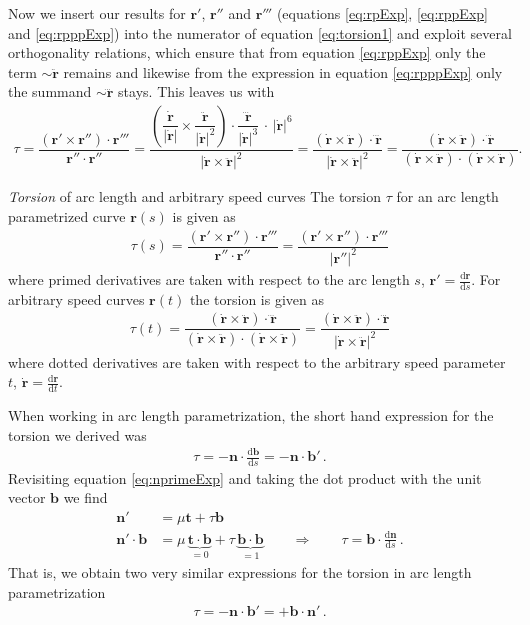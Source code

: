 \documentclass[11pt, DINA4, fleqn]{amsart}
\def\df{\mathrm{d}\xspace}
\newcommand{\dd}[2]{\frac{\df#1}{\df#2}}
\def\vr{\boldsymbol{r}\xspace}
\def\vrd{\dot{\vr}\xspace}
\def\vrdd{\ddot{\vr}\xspace}
\def\vrddd{\dddot{\vr}\xspace}
\def\vrp{{\vr}'\xspace}
\def\vt{\boldsymbol{t}\xspace}
\def\vn{\boldsymbol{n}\xspace}
\def\vb{\boldsymbol{b}\xspace}
\begin{document}
Now we insert our results for $\vr'$, $\vr''$ and $\vr'''$ (equations \eqref{eq:rpExp}, \eqref{eq:rppExp} and \eqref{eq:rpppExp}) into the numerator of equation \eqref{eq:torsion1} and exploit several orthogonality relations, which ensure that from equation \eqref{eq:rppExp} only the term $\sim \vrdd$ remains and likewise from the expression in equation \eqref{eq:rpppExp} only the summand $\sim\vrddd$ stays. This leaves us with
\begin{align}
\tau =
\dfrac{ \left(\vr'\times \vr''\right) \cdot \vr'''}{\vr''\cdot \vr''} =
\dfrac{\left(\dfrac{\vrd}{|\vrd|} \times \dfrac{\vrdd}{|\vrd|^2}\right) \cdot \dfrac{\vrddd}{|\vrd|^3}  \, \cdot \,|\vrd|^6}{|\vrd \times \vrdd|^2}
= 
\dfrac{\left(\vrd \times \vrdd \right) \cdot \vrddd }{|\vrd \times \vrdd|^2}
= 
\dfrac{\left(\vrd \times \vrdd \right) \cdot \vrddd }{(\vrd \times \vrdd)\cdot (\vrd \times \vrdd)}.
\end{align}

\begin{mybox_tc3}{\emph{Torsion} of arc length and arbitrary speed curves}
The torsion $\tau$ for an arc length parametrized curve $\vr(s)$ is given as
\begin{align}
\tau(s) = \dfrac{ \left(\vr'\times \vr''\right) \cdot \vr'''}{\vr''\cdot \vr''} = \dfrac{ \left(\vr'\times \vr''\right) \cdot \vr'''}{|\vr''|^2}
\end{align}
where primed derivatives are taken with respect to the arc length $s$, $\vrp = \dd{\vr}{s}$. For arbitrary speed curves $\vr(t)$ the torsion is given as
\begin{align}
\tau(t) = 
\dfrac{\left(\vrd \times \vrdd \right) \cdot \vrddd }{(\vrd \times \vrdd)\cdot (\vrd \times \vrdd)}
=
\dfrac{\left(\vrd \times \vrdd \right) \cdot \vrddd }{|\vrd \times \vrdd|^2}
\end{align}
where dotted derivatives are taken with respect to the arbitrary speed parameter $t$, $\vrd= \dd{\vr}{t}$.
\end{mybox_tc3}
When working in arc length parametrization, the short hand expression for the torsion we derived was
\begin{align}
\tau= -\vn\cdot \dd{\vb}{s} = -\vn \cdot \vb' \, .
\end{align}
Revisiting equation \eqref{eq:nprimeExp} and taking the dot product with the unit vector $\vb$ we find
\begin{align}
\vn' &= \mu \vt + \tau \vb \\
\vn' \cdot \vb &= \mu\, \underbrace{\vt \cdot \vb}_{=0} + \tau\, \underbrace{\vb \cdot \vb}_{=1} \qquad \Longrightarrow \qquad \tau = \vb \cdot \dd{\vn}{s} \, .
\end{align}
That is, we obtain two very similar expressions for the torsion in arc length parametrization
\begin{align}
\tau = -\vn \cdot \vb' = + \vb \cdot \vn' \, .
\end{align}
\end{document}

